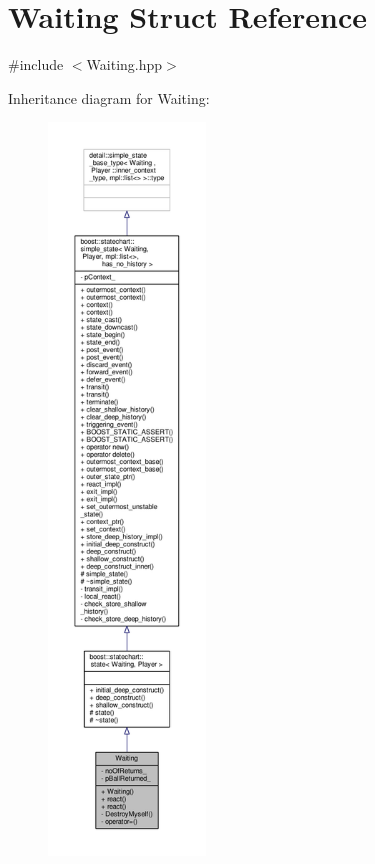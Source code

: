 \hypertarget{struct_waiting}{}\section{Waiting Struct Reference}
\label{struct_waiting}


{\ttfamily \#include $<$Waiting.\+hpp$>$}



Inheritance diagram for Waiting\+:
\nopagebreak
\begin{figure}[H]
\begin{center}
\leavevmode
\includegraphics[height=550pt]{struct_waiting__inherit__graph}
\end{center}
\end{figure}



